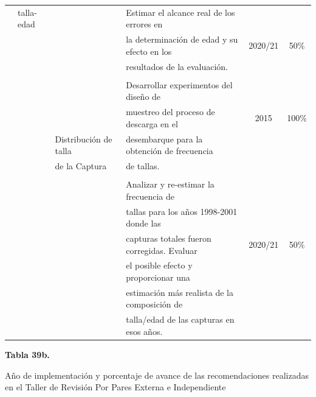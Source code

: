 \documentclass[
  spanish,
]{article}
\begin{document}
\begin{table}[h]
{\begin{tabular}{|c|l|l|l|c|c|}
     & talla-edad    &                      & Estimar el alcance real de los errores en       &              & \\
     &               &                      & la determinación de edad y su efecto en los     &  2020/21     & 50\% \\
     &               &                      & resultados de la evaluación.                    &              & \\
     &               &                      &                                                 &              & \\ 
     &               &                      & Desarrollar experimentos del diseño de          &              & \\
     &               &                      & muestreo del proceso de descarga en el          &  2015        & 100\%\\
     &               & Distribución de talla& desembarque para la obtención de frecuencia     &              & \\
     &               & de la Captura        & de tallas.                                      &              & \\
     &               &                      &                                                 &              & \\
     &               &                      & Analizar y re-estimar la frecuencia de          &              & \\
     &               &                      & tallas para los años 1998-2001 donde las        &              & \\
     &               &                      & capturas totales fueron corregidas.  Evaluar    &  2020/21     &  50\%\\
     &               &                      & el posible efecto y proporcionar una            &              & \\
     &               &                      & estimación más realista de la composición de    &              & \\
     &               &                      &  talla/edad de las capturas en esos años.       &              & \\\hline
  \end{tabular}}
    \end{table}

\pagebreak

\small
\begin{center} 
\textbf{Tabla 39b.}
\end{center}
\begin{center} 
\vspace{-0.2cm} Año de implementación y porcentaje de avance de las recomendaciones realizadas en el Taller de Revisión Por Pares Externa e Independiente
\end{center}
\vspace{-0.2cm}
\end{document}
